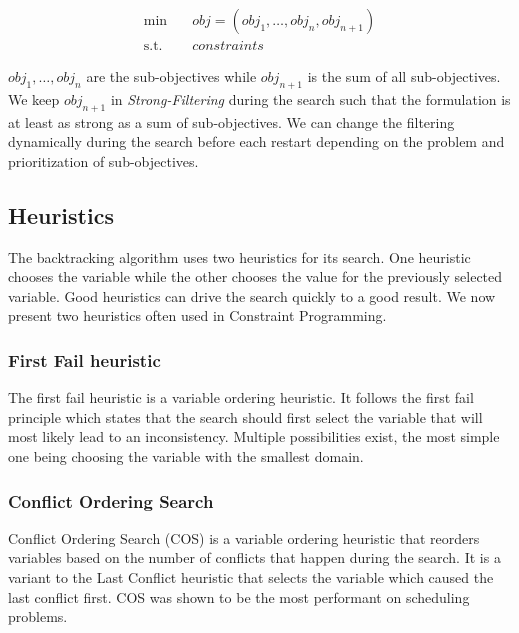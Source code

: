 \documentclass[../../thesis.tex]{subfiles}
\begin{document}
\begin{align*}
  \text{min} \quad & obj = (obj_1, \dots, obj_n, obj_{n+1}) \\
  \text{s.t.} \quad & constraints 
\end{align*}

$obj_1, \dots, obj_n$ are the sub-objectives while $obj_{n+1}$ is the sum of all sub-objectives. We keep $obj_{n+1}$ in 
\emph{Strong-Filtering} during the search such that the formulation is at least as strong as a sum of sub-objectives.
We can change the filtering dynamically during the search before each restart depending on the problem and prioritization of sub-objectives.

\subsection{Heuristics}

The backtracking algorithm uses two heuristics for its search. One heuristic chooses the variable while the other chooses 
the value for the previously selected variable. Good heuristics can drive the search quickly to a good result. We now present two
heuristics often used in Constraint Programming.

\subsubsection{First Fail heuristic}

The first fail heuristic is a variable ordering heuristic. 
It follows the first fail principle which states that the search should first 
select the variable that will most likely lead to an inconsistency. Multiple 
possibilities exist, the most simple one being choosing the variable with the smallest domain.

\subsubsection{Conflict Ordering Search}

Conflict Ordering Search (COS) \cite{Gay:COS} is a variable ordering heuristic that 
reorders variables based on the number of conflicts that happen during the search.
It is a variant to the Last Conflict heuristic that selects the variable which caused the last conflict first.
COS was shown to be the most performant on scheduling problems.
\end{document}

